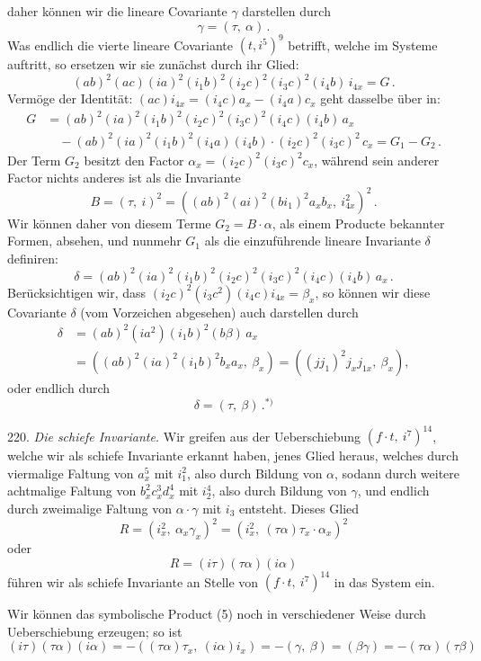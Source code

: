 \documentclass[11pt]{article}
\providecommand{\weberpage}[1]{}
\providecommand{\weq}[2]{\begin{equation}\tag{#1}#2\end{equation}}
\begin{document}
\weberpage{246}
daher k\"onnen wir die lineare Covariante $\gamma$ darstellen durch
\weq{3}{\gamma = (\tau,\ \alpha)\,.}
Was endlich die vierte lineare Covariante $(t, i^5)^9$ betrifft, welche im Systeme auftritt, so ersetzen wir sie zun\"achst durch ihr Glied:
\[
(ab)^2(ac)(ia)^2(i_1b)^2(i_2c)^2(i_3c)^2(i_4b)\,i_{4x} = G\,.
\]
Verm\"oge der Identit\"at: $(ac)i_{4x} = (i_4c)a_x - (i_4a)c_x$ geht dasselbe \"uber in:
\[
\begin{aligned}
G &= (ab)^2(ia)^2(i_1b)^2(i_2c)^2(i_3c)^2(i_4c)(i_4b)\,a_x \\
  &\quad - (ab)^2(ia)^2(i_1b)^2(i_4a)(i_4b)\cdot(i_2c)^2(i_3c)^2\,c_x = G_1 - G_2\,.
\end{aligned}
\]
Der Term $G_2$ besitzt den Factor $\alpha_x = (i_2c)^2(i_3c)^2 c_x$, w\"ahrend sein anderer Factor nichts anderes ist als die Invariante
\[
B = (\tau,\ i)^2 = ((ab)^2(ai)^2(bi_1)^2 a_x b_x,\ i_{4x}^2)^2\,.
\]
Wir k\"onnen daher von diesem Terme $G_2 = B \cdot \alpha$, als einem Producte bekannter Formen, absehen, und nunmehr $G_1$ als die einzuf\"uhrende lineare Invariante $\delta$ definiren:
\[
\delta = (ab)^2(ia)^2(i_1b)^2(i_2c)^2(i_3c)^2(i_4c)(i_4b)\,a_x\,.
\]
Ber\"ucksichtigen wir, dass $(i_2c)^2(i_3c^2)(i_4c)i_{4x} = \beta_x$, so k\"onnen wir diese Covariante $\delta$ (vom Vorzeichen abgesehen) auch darstellen durch
\[
\begin{aligned}
\delta &= (ab)^2(ia^2)(i_1b)^2(b\beta)\,a_x \\
       &= ((ab)^2(ia)^2(i_1b)^2 b_x a_x,\ \beta_x) = ((jj_1)^2 j_x j_{1x},\ \beta_x),
\end{aligned}
\]
oder endlich durch
\weq{4}{\delta = (\tau,\ \beta)\,.{}^{*)}}

220. \textit{Die schiefe Invariante.} Wir greifen aus der Ueberschiebung $(f\cdot t,\ i^7)^{14}$, welche wir als schiefe Invariante erkannt haben, jenes Glied heraus, welches durch viermalige Faltung von $a_x^5$ mit $i_1^2$, also durch Bildung von $\alpha$, sodann durch weitere achtmalige Faltung von $b_x^2 c_x^3 d_x^4$ mit $i_2^4$, also durch Bildung von $\gamma$, und endlich durch zweimalige Faltung von $\alpha \cdot \gamma$ mit $i_3$ entsteht. Dieses Glied
\[
R = (i_x^2,\ \alpha_x \gamma_x)^2 = (i_x^2,\ (\tau\alpha)\tau_x \cdot \alpha_x)^2
\]
oder
\weq{5}{R = (i\tau)(\tau\alpha)(i\alpha)}
f\"uhren wir als schiefe Invariante an Stelle von $(f\cdot t,\ i^7)^{14}$ in das System ein.

Wir k\"onnen das symbolische Product (5) noch in verschiedener Weise durch Ueberschiebung erzeugen; so ist
\weq{6}{(i\tau)(\tau\alpha)(i\alpha) = -((\tau\alpha)\tau_x,\ (i\alpha)i_x) = -(\gamma,\ \beta) = (\beta\gamma) = -(\tau\alpha)(\tau\beta)}
\end{document}
